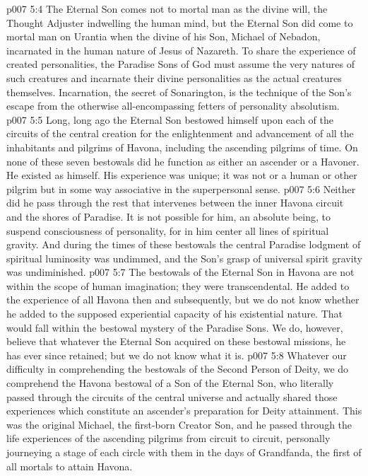 \vs p007 5:4 The Eternal Son comes not to mortal man as the divine will, the Thought Adjuster indwelling the human mind, but the Eternal Son did come to mortal man on Urantia when the divine  of his Son, Michael of Nebadon, incarnated in the human nature of Jesus of Nazareth. To share the experience of created personalities, the Paradise Sons of God must assume the very natures of such creatures and incarnate their divine personalities as the actual creatures themselves. Incarnation, the secret of Sonarington, is the technique of the Son’s escape from the otherwise all\hyp{}encompassing fetters of personality absolutism.
\vs p007 5:5 \pc Long, long ago the Eternal Son bestowed himself upon each of the circuits of the central creation for the enlightenment and advancement of all the inhabitants and pilgrims of Havona, including the ascending pilgrims of time. On none of these seven bestowals did he function as either an ascender or a Havoner. He existed as himself. His experience was unique; it was not  or  a human or other pilgrim but in some way associative in the superpersonal sense.
\vs p007 5:6 Neither did he pass through the rest that intervenes between the inner Havona circuit and the shores of Paradise. It is not possible for him, an absolute being, to suspend consciousness of personality, for in him center all lines of spiritual gravity. And during the times of these bestowals the central Paradise lodgment of spiritual luminosity was undimmed, and the Son’s grasp of universal spirit gravity was undiminished.
\vs p007 5:7 \pc The bestowals of the Eternal Son in Havona are not within the scope of human imagination; they were transcendental. He added to the experience of all Havona then and subsequently, but we do not know whether he added to the supposed experiential capacity of his existential nature. That would fall within the bestowal mystery of the Paradise Sons. We do, however, believe that whatever the Eternal Son acquired on these bestowal missions, he has ever since retained; but we do not know what it is.
\vs p007 5:8 \pc Whatever our difficulty in comprehending the bestowals of the Second Person of Deity, we do comprehend the Havona bestowal of a Son of the Eternal Son, who literally passed through the circuits of the central universe and actually shared those experiences which constitute an ascender’s preparation for Deity attainment. This was the original Michael, the first\hyp{}born Creator Son, and he passed through the life experiences of the ascending pilgrims from circuit to circuit, personally journeying a stage of each circle with them in the days of Grandfanda, the first of all mortals to attain Havona.
